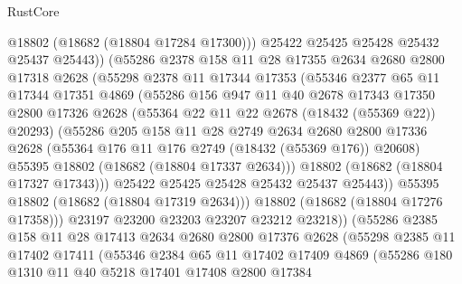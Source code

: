 \begin{lexlean}{RustCore}
\begin{coremodule}
                  @18802
                  (@18682 (@18804 @17284 @17300)))
                @25422
                @25425
                @25428
                @25432
                @25437
                @25443))
            (@55286
              @2378
              @158
              @11
              @28
              @17355
              @2634
              @2680
              @2800
              @17318
              @2628
              (@55298
                @2378
                @11
                @17344
                @17353
                (@55346
                  @2377
                  @65
                  @11
                  @17344
                  @17351
                  @4869
                  (@55286
                    @156
                    @947
                    @11
                    @40
                    @2678
                    @17343
                    @17350
                    @2800
                    @17326
                    @2628
                    (@55364 @22 @11 @22 @2678 (@18432 (@55369 @22)) @20293)
                    (@55286
                      @205
                      @158
                      @11
                      @28
                      @2749
                      @2634
                      @2680
                      @2800
                      @17336
                      @2628
                      (@55364 @176 @11 @176 @2749 (@18432 (@55369 @176)) @20608)
                      @55395
                      @18802
                      (@18682 (@18804 @17337 @2634)))
                    @18802
                    (@18682 (@18804 @17327 @17343)))
                  @25422
                  @25425
                  @25428
                  @25432
                  @25437
                  @25443))
              @55395
              @18802
              (@18682 (@18804 @17319 @2634)))
            @18802
            (@18682 (@18804 @17276 @17358)))
          @23197
          @23200
          @23203
          @23207
          @23212
          @23218))
      (@55286
        @2385
        @158
        @11
        @28
        @17413
        @2634
        @2680
        @2800
        @17376
        @2628
        (@55298
          @2385
          @11
          @17402
          @17411
          (@55346
            @2384
            @65
            @11
            @17402
            @17409
            @4869
            (@55286
              @180
              @1310
              @11
              @40
              @5218
              @17401
              @17408
              @2800
              @17384

\end{coremodule}
\end{lexlean}
